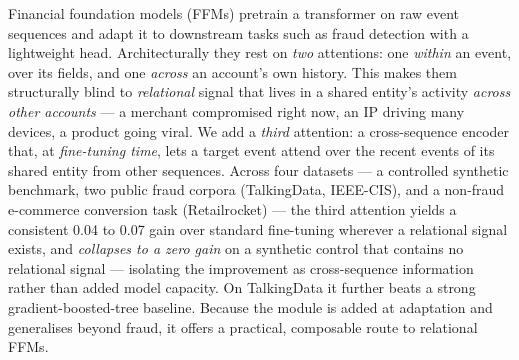 Financial foundation models (FFMs) pretrain a transformer on raw event sequences and adapt it to
downstream tasks such as fraud detection with a lightweight head. Architecturally they rest on
\emph{two} attentions: one \emph{within} an event, over its fields, and one \emph{across} an
account's own history. This makes them structurally blind to \emph{relational} signal that lives in
a shared entity's activity \emph{across other accounts} --- a merchant compromised right now, an IP
driving many devices, a product going viral. We add a \emph{third} attention: a cross-sequence
encoder that, at \emph{fine-tuning time}, lets a target event attend over the recent events of its
shared entity from other sequences. Across four datasets --- a controlled synthetic benchmark, two
public fraud corpora (TalkingData, IEEE-CIS), and a non-fraud e-commerce conversion task
(Retailrocket) --- the third attention yields a consistent \num{+0.04} to \num{+0.07} \prauc{} gain
over standard fine-tuning wherever a relational signal exists, and \emph{collapses to a zero gain}
on a synthetic control that contains no relational signal --- isolating the improvement as
cross-sequence information rather than added model capacity. On TalkingData it further beats a
strong gradient-boosted-tree baseline. Because the module is added at adaptation and generalises
beyond fraud, it offers a practical, composable route to relational FFMs.
